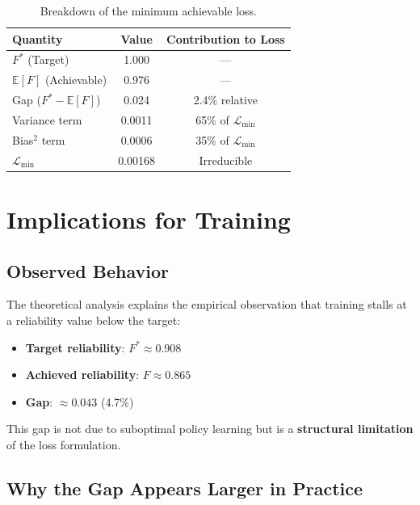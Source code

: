 \documentclass[11pt,a4paper]{article}
\theoremstyle{definition}
\newcommand{\E}{\mathbb{E}}
\begin{document}
\begin{table}[H]
\centering
\begin{tabular}{lcc}
\toprule
\textbf{Quantity} & \textbf{Value} & \textbf{Contribution to Loss} \\
\midrule
$F^*$ (Target) & 1.000 & --- \\
$\E[F]$ (Achievable) & 0.976 & --- \\
Gap ($F^* - \E[F]$) & 0.024 & 2.4\% relative \\
\midrule
Variance term & 0.0011 & 65\% of $\mathcal{L}_{\min}$ \\
Bias$^2$ term & 0.0006 & 35\% of $\mathcal{L}_{\min}$ \\
\midrule
$\mathcal{L}_{\min}$ & 0.00168 & Irreducible \\
\bottomrule
\end{tabular}
\caption{Breakdown of the minimum achievable loss.}
\end{table}

\section{Implications for Training}

\subsection{Observed Behavior}

The theoretical analysis explains the empirical observation that training stalls at a reliability value below the target:

\begin{itemize}
    \item \textbf{Target reliability}: $F^* \approx 0.908$
    \item \textbf{Achieved reliability}: $F \approx 0.865$
    \item \textbf{Gap}: $\approx 0.043$ (4.7\%)
\end{itemize}

This gap is not due to suboptimal policy learning but is a \textbf{structural limitation} of the loss formulation.

\subsection{Why the Gap Appears Larger in Practice}
\end{document}
